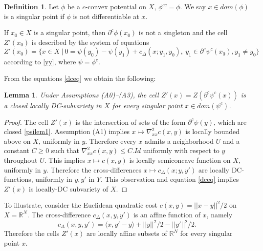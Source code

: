 \documentclass[12pt]{amsart}
\newtheorem{lem}{Lemma}
\theoremstyle{definition}
\newtheorem{dfn}{Definition}
\theoremstyle{remark}
\newcommand{\bR}{\mathbb{R}}
\newcommand{\del}{\partial}
\newcommand{\cd}{c_\Delta}
\begin{document}



\begin{dfn}
Let $\phi$ be a $c$-convex potential on $X$, $\phi^{cc}=\phi$. We say $x\in dom(\phi)$ is a singular point if $\phi$ is not differentiable at $x$.  
\end{dfn}
If $x_0\in X$ is a singular point, then $\del^c \phi(x_0)$ is not a singleton and the cell $Z'(x_0)$ is described by the system of equations \begin{equation} Z'(x_0)=\{x\in X~|~ 0=\psi(y_0)-\psi(y_1) +\cd(x; y_1, y_0), ~ y_1 \in \del^c \psi^c(x_0), y_1\neq y_0\} \label{dceq}\end{equation} according to \eqref{yy}, where $\psi=\phi^c$.

From the equations \eqref{dceq} we obtain the following:
\begin{lem}\label{ldc} 
Under Assumptions (A0)--(A3), the cell $Z'(x)=Z(\del^c \psi^c(x))$ is a closed locally DC-subvariety in $X$ for every singular point $x\in dom(\psi^c)$. 
\end{lem}
\begin{proof}
The cell $Z'(x)$ is the intersection of sets of the form $\del^c \psi(y)$, which are closed \ref{psilem1}. Assumption (A1) implies $x\mapsto \nabla^2_{xx} c(x,y)$ is locally bounded above on $X$, uniformly in $y$. Therefore every $x$ admits a neighborhood $U$ and a constant $C\geq 0$ such that $\nabla_{xx}^2 c(x,y) \leq C.Id$ uniformly with respect to $y$ throughout $U$. This implies $x\mapsto c(x,y)$ is locally semiconcave function on $X$, uniformly in $y$. Therefore the cross-differences $x \mapsto \cd(x;y,y')$ are locally DC-functions, uniformly in $y,y'$ in $Y$. This observation and equation \eqref{dceq} implies $Z'(x)$ is locally-DC subvariety of $X$.  
\end{proof}

To illustrate, consider the Euclidean quadratic cost $c(x,y)=||x-y||^2/2$ on $X=\bR^N$. The cross-difference $\cd(x,y,y')$ is an affine function of $x$, namely $$\cd(x,y,y')=\langle x, y'-y\rangle + ||y||^2/2-||y'||^2/2.$$ Therefore the cells $Z'(x)$ are locally affine subsets of $\bR^N$ for every singular point $x$. 
\end{document}

